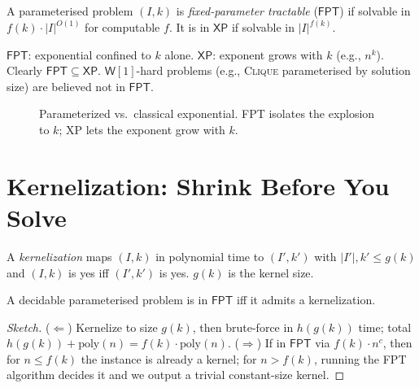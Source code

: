 \begin{definition}
A parameterised problem $(I,k)$ is \emph{fixed-parameter tractable} ($\mathsf{FPT}$) if solvable in $f(k)\cdot|I|^{O(1)}$ for computable $f$. It is in $\mathsf{XP}$ if solvable in $|I|^{f(k)}$.
\end{definition}

$\mathsf{FPT}$: exponential confined to $k$ alone. $\mathsf{XP}$: exponent grows with $k$ (e.g., $n^k$). Clearly $\mathsf{FPT}\subseteq\mathsf{XP}$. $\mathsf{W}[1]$-hard problems (e.g., \textsc{Clique} parameterised by solution size) are believed not in $\mathsf{FPT}$.

\begin{figure}[h]\centering
{}
\caption{Parameterized vs.\ classical exponential. FPT isolates the explosion to $k$; XP lets the exponent grow with $k$.}
\label{fig:fpt-vs-xp}
\end{figure}

\section{Kernelization: Shrink Before You Solve}
\label{sec:kernel}

\begin{definition}[Kernel]
A \emph{kernelization} maps $(I,k)$ in polynomial time to $(I',k')$ with $|I'|,k'\le g(k)$ and $(I,k)$ is yes iff $(I',k')$ is yes. $g(k)$ is the kernel size.
\end{definition}

\begin{theorem}
A decidable parameterised problem is in $\mathsf{FPT}$ iff it admits a kernelization.
\end{theorem}
\begin{proof}[Sketch]
($\Leftarrow$) Kernelize to size $g(k)$, then brute-force in $h(g(k))$ time; total $h(g(k))+\text{poly}(n)=f(k)\cdot\text{poly}(n)$. ($\Rightarrow$) If in $\mathsf{FPT}$ via $f(k)\cdot n^c$, then for $n\le f(k)$ the instance is already a kernel; for $n>f(k)$, running the FPT algorithm decides it and we output a trivial constant-size kernel.
\end{proof}

